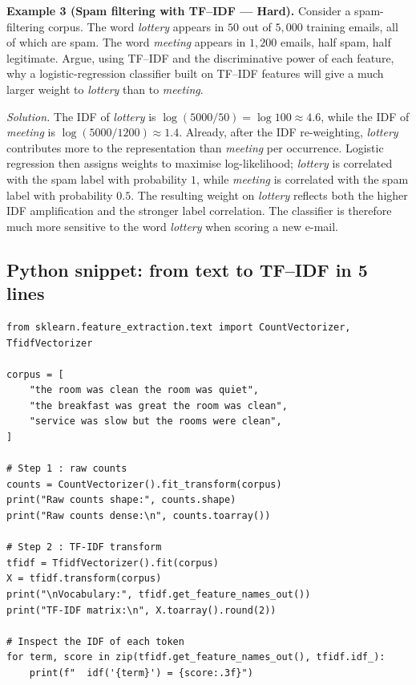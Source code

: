 \documentclass[12pt,a4paper]{report}
\theoremstyle{definition}
\theoremstyle{remark}
\begin{document}
\medskip

\textbf{Example 3 (Spam filtering with TF--IDF --- Hard).}
Consider a spam-filtering corpus. The word \emph{lottery} appears in $50$ out of $5{,}000$ training emails, all of which are spam. The word \emph{meeting} appears in $1{,}200$ emails, half spam, half legitimate. Argue, using TF--IDF and the discriminative power of each feature, why a logistic-regression classifier built on TF--IDF features will give a much larger weight to \emph{lottery} than to \emph{meeting}.

\textit{Solution.} The IDF of \emph{lottery} is $\log(5000/50) = \log 100 \approx 4.6$, while the IDF of \emph{meeting} is $\log(5000/1200) \approx 1.4$. Already, after the IDF re-weighting, \emph{lottery} contributes more to the representation than \emph{meeting} per occurrence. Logistic regression then assigns weights to maximise log-likelihood; \emph{lottery} is correlated with the spam label with probability $1$, while \emph{meeting} is correlated with the spam label with probability $0.5$. The resulting weight on \emph{lottery} reflects both the higher IDF amplification and the stronger label correlation. The classifier is therefore much more sensitive to the word \emph{lottery} when scoring a new e-mail.

\subsection{Python snippet: from text to TF--IDF in 5 lines}

\begin{lstlisting}
from sklearn.feature_extraction.text import CountVectorizer, TfidfVectorizer

corpus = [
    "the room was clean the room was quiet",
    "the breakfast was great the room was clean",
    "service was slow but the rooms were clean",
]

# Step 1 : raw counts
counts = CountVectorizer().fit_transform(corpus)
print("Raw counts shape:", counts.shape)
print("Raw counts dense:\n", counts.toarray())

# Step 2 : TF-IDF transform
tfidf = TfidfVectorizer().fit(corpus)
X = tfidf.transform(corpus)
print("\nVocabulary:", tfidf.get_feature_names_out())
print("TF-IDF matrix:\n", X.toarray().round(2))

# Inspect the IDF of each token
for term, score in zip(tfidf.get_feature_names_out(), tfidf.idf_):
    print(f"  idf('{term}') = {score:.3f}")
\end{lstlisting}
\end{document}
